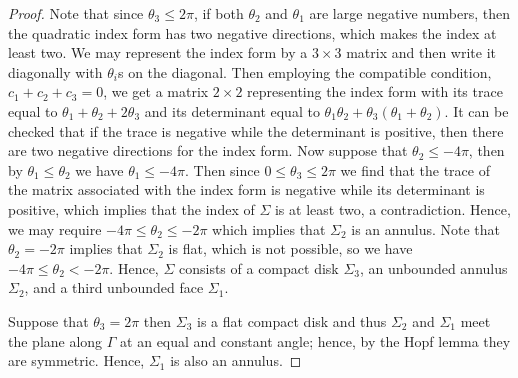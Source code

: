 \documentclass[11pt]{amsart}
\numberwithin{equation}{section}
\theoremstyle{theorem}
\theoremstyle{definition}
\numberwithin{equation}{section}
\begin{document}
\begin{proof}
Note that since $\theta_3\leq 2\pi$, if both $\theta_2$ and $\theta_1$ are large negative numbers, then the quadratic index form has two negative directions, which makes the index at least two. We may represent the index form by a $3\times 3$ matrix and then write it diagonally with $\theta_i$s on the diagonal. Then employing the compatible condition, $c_1+c_2+c_3=0$, we get a matrix $2\times 2$ representing the index form with its trace equal to $\theta_1+\theta_2+2\theta_3$ and its determinant equal to $\theta_1\theta_2+\theta_3(\theta_1+\theta_2)$. It can be checked that if the trace is negative while the determinant is positive, then there are two negative directions for the index form. Now suppose that $\theta_2 \leq -4\pi$, then by $\theta_1\leq \theta_2$ we have $\theta_1 \leq -4\pi$. Then since $0\leq \theta_3\leq 2\pi$ we find that the trace of the matrix associated with the index form is negative while its determinant is positive, which implies that the index of $\Sigma$ is at least two, a contradiction. Hence, we may require $-4\pi \leq \theta_2\leq -2\pi$ which implies that $\Sigma_2$ is an annulus. Note that $\theta_2=-2\pi$ implies that $\Sigma_2$ is flat, which is not possible, so we have $-4\pi \leq \theta_2< -2\pi$. Hence, $\Sigma$ consists of a compact disk $\Sigma_3$, an unbounded annulus $\Sigma_2$, and a third unbounded face $\Sigma_1$. 
\medskip

Suppose that $\theta_3 =2\pi$ then $\Sigma_3$ is a flat compact disk and thus $\Sigma_2$ and $\Sigma_1$ meet the plane along $\Gamma$ at an equal and constant angle; hence, by the Hopf lemma they are symmetric. Hence, $\Sigma_1$ is also an annulus. 


\end{proof}
\end{document}
